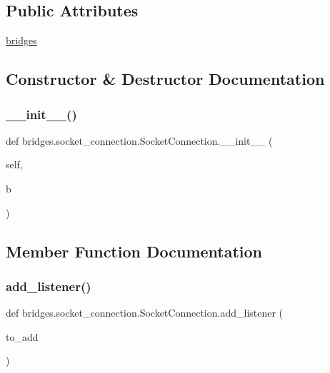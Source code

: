\subsection*{Public Attributes}
\begin{DoxyCompactItemize}
\item 
\mbox{\hyperlink{classbridges_1_1socket__connection_1_1_socket_connection_a81266f99e3601d2d2abeb95bd78fc602}{bridges}}
\end{DoxyCompactItemize}


\subsection{Constructor \& Destructor Documentation}
\mbox{\label{classbridges_1_1socket__connection_1_1_socket_connection_ae241a5233f4cb8ad07e9a716ebfa3e55}} 
\subsubsection{\texorpdfstring{\_\_init\_\_()}{\_\_init\_\_()}}
{\footnotesize\ttfamily def bridges.\+socket\+\_\+connection.\+Socket\+Connection.\+\_\+\+\_\+init\+\_\+\+\_\+ (\begin{DoxyParamCaption}\item[{}]{self,  }\item[{}]{b }\end{DoxyParamCaption})}



\subsection{Member Function Documentation}
\mbox{\label{classbridges_1_1socket__connection_1_1_socket_connection_a21d94eb97d7ea92e38dc8e78f1e40876}} 
\subsubsection{\texorpdfstring{add\_listener()}{add\_listener()}}
{\footnotesize\ttfamily def bridges.\+socket\+\_\+connection.\+Socket\+Connection.\+add\+\_\+listener (\begin{DoxyParamCaption}\item[{}]{to\+\_\+add }\end{DoxyParamCaption})\hspace{0.3cm}{\ttfamily [static]}}

